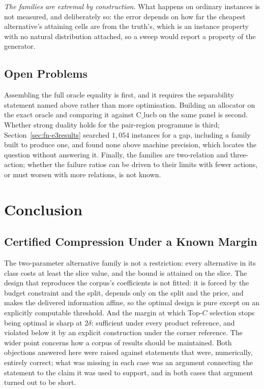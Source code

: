 \documentclass[conference]{IEEEtran}
\theoremstyle{definition}
\begin{document}
\emph{The families are extremal by construction.} What happens on ordinary instances is not
measured, and deliberately so: the error depends on how far the cheapest alternative's
attaining cells are from the truth's, which is an instance property with no natural
distribution attached, so a sweep would report a property of the generator.

\subsection{Open Problems}

Assembling the full oracle equality is first, and it requires the separability statement named
above rather than more optimisation. Building an allocator on the exact oracle and comparing
it against $\mathrm{C\_lucb}$ on the same panel is second. Whether strong duality holds for
the pair-region programme is third; Section~\ref{sec:fn-e3results} searched $1{,}054$ instances
for a gap, including a family built to produce one, and found none above machine precision,
which locates the question without answering it. Finally, the families are two-relation and three-action;
whether the failure ratios can be driven to their limits with fewer actions, or must worsen
with more relations, is not known.


\section{Conclusion}

\subsection{Certified Compression Under a Known Margin}

The two-parameter alternative family is not a restriction: every alternative in its class
costs at least the slice value, and the bound is attained on the slice. The design
that reproduces the corpus's coefficients is not fitted: it is forced by the budget constraint
and the split, depends only on the split and the price, and makes the delivered information
affine, so the optimal design is pure except on an explicitly computable threshold. And the
margin at which Top-$C$ selection stops being optimal is sharp at $2\delta$: sufficient under
every product reference, and violated below it by an explicit construction under the corner
reference. The wider point concerns how a corpus of results should be maintained. Both
objections answered here were raised against statements that were, numerically, entirely
correct; what was missing in each case was an argument connecting the statement to the claim
it was used to support, and in both cases that argument turned out to be short.
\end{document}
